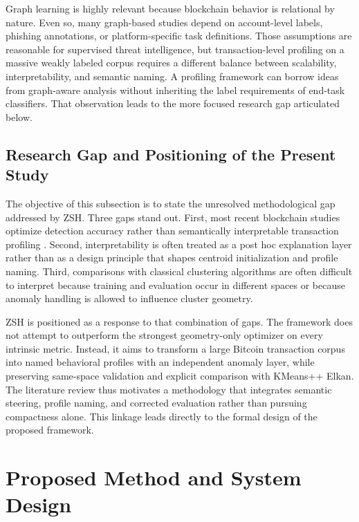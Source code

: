 \documentclass{ieeeaccess}
\begin{document}
Graph learning is highly relevant because blockchain behavior is relational by nature. Even so, many graph-based studies depend on account-level labels, phishing annotations, or platform-specific task definitions. Those assumptions are reasonable for supervised threat intelligence, but transaction-level profiling on a massive weakly labeled corpus requires a different balance between scalability, interpretability, and semantic naming. A profiling framework can borrow ideas from graph-aware analysis without inheriting the label requirements of end-task classifiers. That observation leads to the more focused research gap articulated below.

\subsection{Research Gap and Positioning of the Present Study}

The objective of this subsection is to state the unresolved methodological gap addressed by ZSH. Three gaps stand out. First, most recent blockchain studies optimize detection accuracy rather than semantically interpretable transaction profiling \cite{ref5,ref8,ref21,ref30}. Second, interpretability is often treated as a post hoc explanation layer rather than as a design principle that shapes centroid initialization and profile naming. Third, comparisons with classical clustering algorithms are often difficult to interpret because training and evaluation occur in different spaces or because anomaly handling is allowed to influence cluster geometry.

ZSH is positioned as a response to that combination of gaps. The framework does not attempt to outperform the strongest geometry-only optimizer on every intrinsic metric. Instead, it aims to transform a large Bitcoin transaction corpus into named behavioral profiles with an independent anomaly layer, while preserving same-space validation and explicit comparison with KMeans++ Elkan. The literature review thus motivates a methodology that integrates semantic steering, profile naming, and corrected evaluation rather than pursuing compactness alone. This linkage leads directly to the formal design of the proposed framework.

\section{Proposed Method and System Design}
\end{document}
